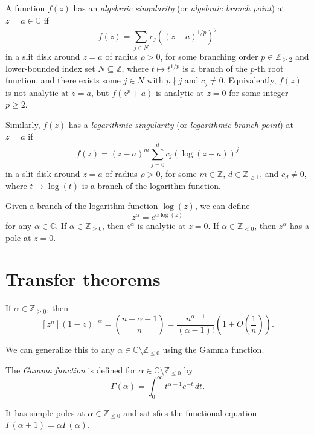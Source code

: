 A function \(f(z)\) has an \emph{algebraic singularity} (or \emph{algebraic branch point}) at \(z = a \in \mathbb{C}\) if
\[
    f(z) = \sum_{j \in N} c_j \left( (z-a)^{1/p} \right)^j
\]
in a slit disk around \(z = a\) of radius \(\rho > 0\), for some branching order \(p \in \mathbb{Z}_{\ge 2}\) and lower-bounded index set \(N \subseteq \mathbb{Z}\), where \(t \mapsto t^{1/p}\) is a branch of the \(p\)-th root function, and there exists some \(j \in N\) with \(p \nmid j\) and \(c_j \neq 0\).
Equivalently, \(f(z)\) is not analytic at \(z = a\), but \(f(z^p + a)\) is analytic at \(z = 0\) for some integer \(p \ge 2\).

Similarly, \(f(z)\) has a \emph{logarithmic singularity} (or \emph{logarithmic branch point}) at \(z = a\) if
\[
    f(z) = (z-a)^m \sum_{j=0}^d c_j \left( \log(z-a) \right)^j
\]
in a slit disk around \(z = a\) of radius \(\rho > 0\), for some \(m \in \mathbb{Z}\), \(d \in \mathbb{Z}_{\ge 1}\), and \(c_d \neq 0\), where \(t \mapsto \log(t)\) is a branch of the logarithm function.

Given a branch of the logarithm function \(\log(z)\), we can define
\[
    z^\alpha = e^{\alpha \log(z)}
\]
for any \(\alpha \in \mathbb{C}\).
If \(\alpha \in \mathbb{Z}_{\ge 0}\), then \(z^\alpha\) is analytic at \(z = 0\).
If \(\alpha \in \mathbb{Z}_{< 0}\), then \(z^\alpha\) has a pole at \(z = 0\).

\section*{Transfer theorems}

If \(\alpha \in \mathbb{Z}_{\ge 0}\), then
\[
    [z^n] (1 - z)^{-\alpha} = \binom{n + \alpha - 1}{n} = \frac{n^{\alpha - 1}}{(\alpha-1)!} \left( 1 + O\left( \frac{1}{n} \right) \right).
\]

We can generalize this to any \(\alpha \in \mathbb{C} \setminus \mathbb{Z}_{\le 0}\) using the Gamma function.

\begin{definition}
    The \emph{Gamma function} is defined for \(\alpha \in \mathbb{C} \setminus \mathbb{Z}_{\le 0}\) by
    \[
        \Gamma(\alpha) = \int_0^\infty t^{\alpha - 1} e^{-t} \, dt.
    \]
\end{definition}

It has simple poles at \(\alpha \in \mathbb{Z}_{\le 0}\) and satisfies the functional equation \(\Gamma(\alpha + 1) = \alpha \Gamma(\alpha)\).

